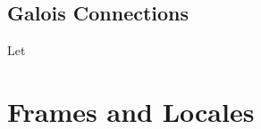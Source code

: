 \documentclass{book}
\begin{document}
	
	
	
	
	
	
	
	
	
	
	
	
	
	
	
	
	
	
	
	
	
	
	
	
	
	
	
	
	
	
	
	
	
	
	
	
	
	
	
	
	
	
	
	
	
	
	
	
	
	
	
	
	
	\section{Galois Connections}
	
	\begin{defn}
		Let 
	\end{defn}
	
	
	
	
	
	
	
	
	
	
	
	
	
	
	
	
	
	
	
	
	
	
	
	
	
	
	
	
	
	
	
	
	
	
	
	
	
	
	
	
	
	
	
	
	
	
	
	
	\chapter{Frames and Locales}
	
\end{document}
